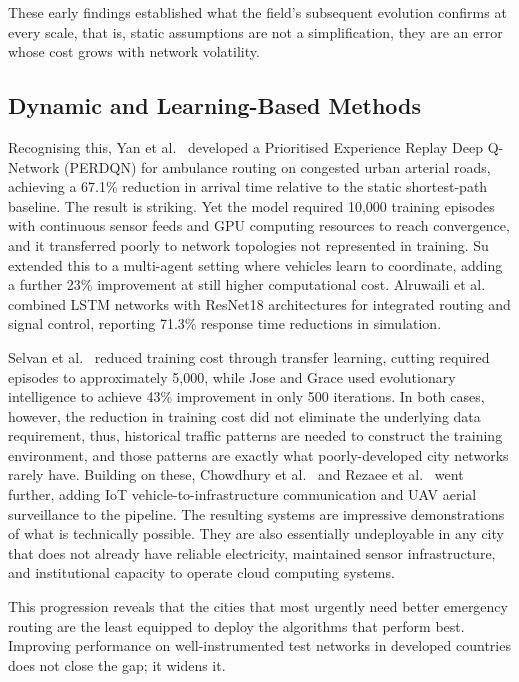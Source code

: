 \documentclass[paper=A4, 12pt, mathscr]{report}
\begin{document}
	These early findings established what the field's subsequent evolution
	confirms at every scale, that is, static assumptions are not a simplification, they
	are an error whose cost grows with network volatility.
	
	\subsection*{Dynamic and Learning-Based Methods}
	
	Recognising this, Yan et al.\ \cite{yan2021} developed a Prioritised
	Experience Replay Deep Q-Network (PERDQN) for ambulance routing on congested
	urban arterial roads, achieving a 67.1\% reduction in arrival time relative
	to the static shortest-path baseline. The result is striking. Yet the
	model required 10,000 training episodes with continuous sensor feeds and
	GPU computing resources to reach convergence, and it transferred poorly
	to network topologies not represented in training. Su \cite{su2025} extended
	this to a multi-agent setting where vehicles learn to coordinate, adding a
	further 23\% improvement at still higher computational cost. Alruwaili et
	al.\ \cite{alruwaili2025} combined LSTM networks with ResNet18 architectures
	for integrated routing and signal control, reporting 71.3\% response time
	reductions in simulation.
	
	Selvan et al.\ \cite{selvan2025} reduced training cost through transfer
	learning, cutting required episodes to approximately 5,000, while Jose and
	Grace \cite{jose2020} used evolutionary intelligence to achieve 43\%
	improvement in only 500 iterations. In both cases, however, the reduction in
	training cost did not eliminate the underlying data requirement, thus, historical
	traffic patterns are needed to construct the training environment, and
	those patterns are exactly what poorly-developed city networks rarely have.
	Building on these, Chowdhury et al.\ \cite{chowdhury2023} and Rezaee et
	al.\ \cite{rezaee2023} went further, adding IoT vehicle-to-infrastructure
	communication and UAV aerial surveillance to the pipeline. The resulting
	systems are impressive demonstrations of what is technically possible. They
	are also essentially undeployable in any city that does not already have
	reliable electricity, maintained sensor infrastructure, and institutional
	capacity to operate cloud computing systems.
	
	This progression reveals that the
	cities that most urgently need better emergency routing are the least equipped
	to deploy the algorithms that perform best. Improving performance on
	well-instrumented test networks in developed countries does not close the
	gap; it widens it.
	
\end{document}
